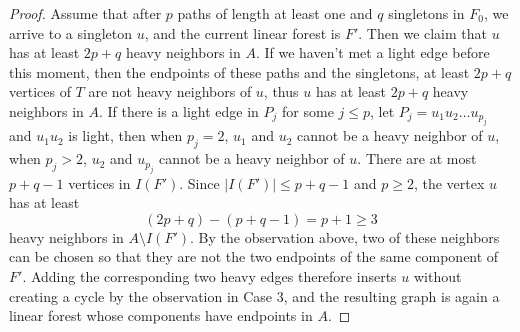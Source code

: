 \documentclass[10pt,a4paper]{amsart}
\begin{document}
\begin{proof}
    Assume that after $p$ paths of length at least one and $q$ singletons in $F_0$, we arrive to a singleton $u$, and the current linear forest is $F'$. 
    Then we claim that $u$ has at least $2p+q$ heavy neighbors in $A$.
    If we haven't met a light edge before this moment, then the endpoints of these paths and the singletons, at least $2p+q$ vertices of $T$ are not heavy neighbors of $u$, thus $u$ has at least $2p+q$ heavy neighbors in $A$. 
    If there is a light edge in $P_{j}$ for some $j \le p$, let $P_j = u_1u_2\ldots u_{p_j}$ and $u_1u_2$ is light, then when $p_j = 2$, $u_1$ and $u_2$ cannot be a heavy neighbor of $u$, when $p_j > 2$, $u_2$ and $u_{p_j}$ cannot be a heavy neighbor of $u$.
    There are at most $p+q-1$ vertices in $I(F')$.
    Since $|I(F')|\le p+q-1$ and $p\ge 2$, the vertex $u$ has at least
$$
(2p+q)-(p+q-1)=p+1\ge 3
$$
heavy neighbors in $A\setminus I(F')$. By the observation above, two of
these neighbors can be chosen so that they are not the two endpoints of the
same component of $F'$. Adding the corresponding two heavy edges therefore
inserts $u$ without creating a cycle by the observation in Case 3, and the resulting graph is again a
linear forest whose components have endpoints in $A$.  
\end{proof}
\end{document}
